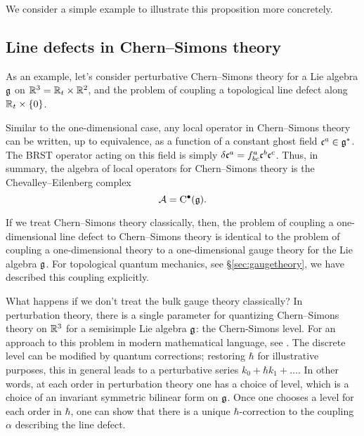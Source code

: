 \documentclass[11pt]{amsart}
\def\brian#1{{\textcolor{blue!65!red}{BRW: {#1}}}}
\def\natalie#1{{\textcolor{green!65!black}{NMP: {#1}}}}
\begin{document}
We consider a simple example to illustrate this proposition more concretely. 

\subsection{Line defects in Chern--Simons theory}

As an example, let's consider perturbative Chern--Simons theory for a Lie algebra $\mathfrak g$ on $\mathbb R^3 = \mathbb R_t \times \mathbb R^2$, and the problem of coupling a topological 
line defect along $\mathbb R_t \times \{0\}$. 

Similar to the one-dimensional case, any local operator in Chern--Simons theory can be written, up to equivalence, as a function of a constant ghost field $\mathfrak c^a \in \mathfrak g^*$. 
The BRST operator acting on this field is simply $\delta \mathfrak c^a = f^a_{bc} \mathfrak c^b \mathfrak c^c$. 
Thus, in summary, the algebra of local operators for Chern--Simons theory is the Chevalley--Eilenberg complex 
\[
\mathcal A = {\rm C}^\bullet(\mathfrak g) .
\]

If we treat Chern--Simons theory classically, then, the problem of coupling a one-dimensional line defect to Chern--Simons theory is identical to the problem of coupling a one-dimensional theory to a one-dimensional gauge theory for the Lie algebra $\mathfrak g$.
For topological quantum mechanics, see \S \ref{sec:gaugetheory}, we have described this coupling explicitly. 


What happens if we don't treat the bulk gauge theory classically? In perturbation theory, there is a single parameter for quantizing Chern--Simons theory on $\mathbb R^3$ for a semisimple Lie algebra $\mathfrak g$: the Chern-Simons level. For an approach to this problem in modern mathematical language, see \cite[Chapter 5]{CosRenorm}. 
The discrete level can be modified by quantum corrections; restoring $\hbar$ for illustrative purposes, this in general leads to a perturbative series $k_0 + \hbar k_1 + \ldots$. In other words, at each order in perturbation theory one has a choice of level, which is a choice of an invariant symmetric bilinear form on $\mathfrak g$. Once one chooses a level for each order in $\hbar$, one can show that there is a unique $\hbar$-correction to the coupling $\alpha$ describing the line defect. 

\end{document}
